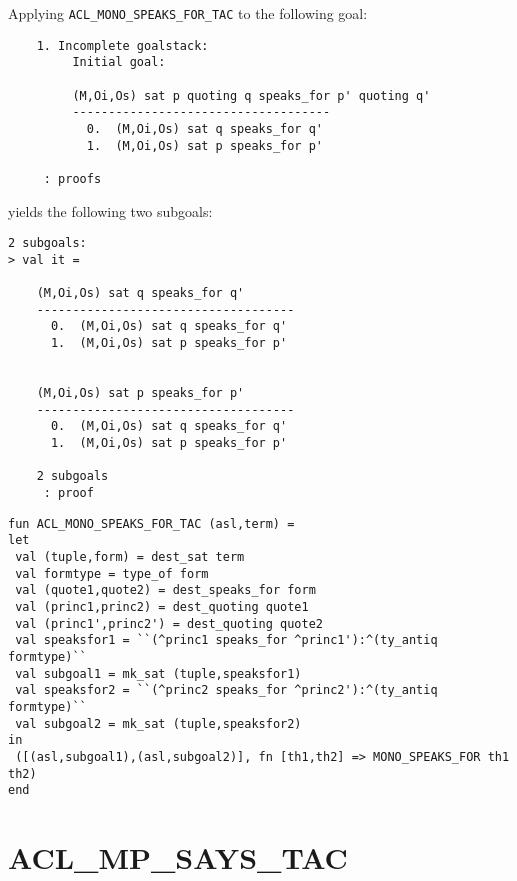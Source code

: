\EXAMPLE
Applying \texttt{ACL\_MONO\_SPEAKS\_FOR\_TAC} to the following goal:
\begin{holboxed}
\begin{verbatim}
    1. Incomplete goalstack:
         Initial goal:
    
         (M,Oi,Os) sat p quoting q speaks_for p' quoting q'
         ------------------------------------
           0.  (M,Oi,Os) sat q speaks_for q'
           1.  (M,Oi,Os) sat p speaks_for p'
    
     : proofs
\end{verbatim}
\end{holboxed}
yields the following two subgoals:
\begin{holboxed}
\begin{verbatim}
2 subgoals:
> val it =
    
    (M,Oi,Os) sat q speaks_for q'
    ------------------------------------
      0.  (M,Oi,Os) sat q speaks_for q'
      1.  (M,Oi,Os) sat p speaks_for p'
    
    
    (M,Oi,Os) sat p speaks_for p'
    ------------------------------------
      0.  (M,Oi,Os) sat q speaks_for q'
      1.  (M,Oi,Os) sat p speaks_for p'
    
    2 subgoals
     : proof
\end{verbatim}
\end{holboxed}

\IMPLEMENTATION
\begin{holboxed}
\begin{verbatim}
fun ACL_MONO_SPEAKS_FOR_TAC (asl,term) =
let
 val (tuple,form) = dest_sat term
 val formtype = type_of form
 val (quote1,quote2) = dest_speaks_for form
 val (princ1,princ2) = dest_quoting quote1
 val (princ1',princ2') = dest_quoting quote2
 val speaksfor1 = ``(^princ1 speaks_for ^princ1'):^(ty_antiq formtype)``
 val subgoal1 = mk_sat (tuple,speaksfor1)
 val speaksfor2 = ``(^princ2 speaks_for ^princ2'):^(ty_antiq formtype)``
 val subgoal2 = mk_sat (tuple,speaksfor2)
in
 ([(asl,subgoal1),(asl,subgoal2)], fn [th1,th2] => MONO_SPEAKS_FOR th1 th2)
end
\end{verbatim}
\end{holboxed}

\SEEALSO
\ENDDOC

\section{ACL\_MP\_SAYS\_TAC}


